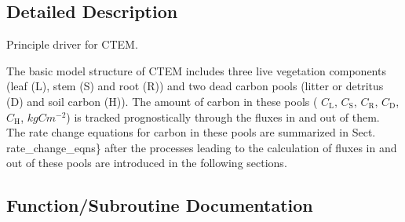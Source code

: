 \subsection{Detailed Description}
Principle driver for C\+T\+E\+M. 

The basic model structure of C\+T\+E\+M includes three live vegetation components (leaf (L), stem (S) and root (R)) and two dead carbon pools (litter or detritus (D) and soil carbon (H)). The amount of carbon in these pools ( $C_\mathrm{L}$, $C_\mathrm{S}$, $C_\mathrm{R}$, $C_\mathrm{D}$, $C_\mathrm{H}$, $kgC m^{-2}$) is tracked prognostically through the fluxes in and out of them. The rate change equations for carbon in these pools are summarized in Sect. rate\+\_\+change\+\_\+eqns\} after the processes leading to the calculation of fluxes in and out of these pools are introduced in the following sections. 

\subsection{Function/\+Subroutine Documentation}
\hypertarget{ctem_8f90_a13ba037da8ed72b5b014f08f8be649ed}{}
